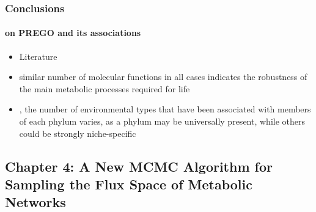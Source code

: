 \documentclass{beamer}
\begin{document}
\begin{frame}
\begin{singlespace}
\begin{columns}[onlytextwidth]

         \end{columns}
      \end{singlespace}

   \end{frame}



   \begin{frame}
      \frametitle{Conclusions}
      \framesubtitle{on PREGO and its associations}

      \small
      \begin{itemize}
         \item Literature 
         \item similar number of molecular functions in all cases indicates the robustness of the main
         metabolic processes required for life
         \item , the number of environmental types that have been associated with members of each phylum varies, as a phylum may be universally present, while others could be
         strongly niche-specific
      \end{itemize}

   \end{frame}





   \begin{darkframes}
      \section{
         \textbf{Chapter 4}: A New MCMC Algorithm for Sampling the Flux Space of Metabolic Networks
      }   
   \end{darkframes}
\end{document}
